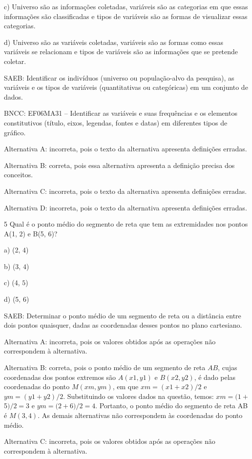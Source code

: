 c) Universo são as informações coletadas, variáveis são as categorias em
que essas informações são classificadas e tipos de variáveis são as
formas de visualizar essas categorias.

d) Universo são as variáveis coletadas, variáveis são as formas como
essas variáveis se relacionam e tipos de variáveis são as informações
que se pretende coletar.

SAEB: Identificar os indivíduos (universo ou população-alvo da
pesquisa), as variáveis e os tipos de variáveis (quantitativas ou
categóricas) em um conjunto de dados.

BNCC: EF06MA31 -- Identificar as variáveis e suas frequências e os
elementos constitutivos (título, eixos, legendas, fontes e datas) em
diferentes tipos de gráfico.

Alternativa A: incorreta, pois o texto da alternativa apresenta
definições erradas.

Alternativa B: correta, pois essa alternativa apresenta a definição
precisa dos conceitos.

Alternativa C: incorreta, pois o texto da alternativa apresenta
definições erradas.

Alternativa D: incorreta, pois o texto da alternativa apresenta
definições erradas.

\num{5}  Qual é o ponto médio do segmento de reta que tem as extremidades nos
pontos A(1, $2$) e B(5, $6$)?

a) (2, $4$)

b) (3, $4$)

c) (4, $5$)

d) (5, $6$)

SAEB: Determinar o ponto médio de um segmento de reta ou a distância
entre dois pontos quaisquer, dadas as coordenadas desses pontos no plano
cartesiano.

Alternativa A: incorreta, pois os valores obtidos após as operações não
correspondem à alternativa.

Alternativa B: correta, pois o ponto médio de um segmento de reta $AB$,
cujas coordenadas dos pontos extremos são 
$A(x1, y1)$ e 
$B(x2, y2)$, é dado
pelas coordenadas do ponto $M(xm, ym)$, em que 
$xm = (x1 + x2)/2$ e 
$ym = (y1 + y2)/2$. 
Substituindo os valores dados na questão, temos: 
$xm = (1 + $5$)/2 = 3$ 
e $ym = (2 + $6$)/2 = 4$. Portanto, o ponto médio do segmento de reta AB
é $M(3, 4)$. As demais alternativas não correspondem às coordenadas do
ponto médio.

Alternativa C: incorreta, pois os valores obtidos após as operações não
correspondem à alternativa.


